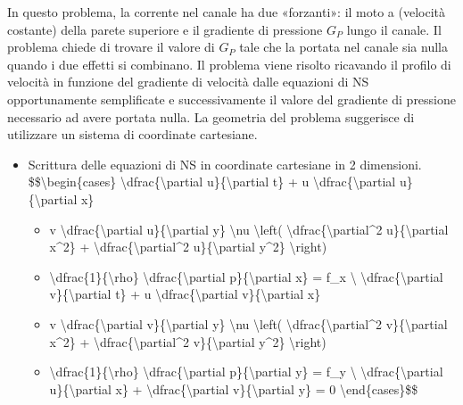 \documentclass[letterpaper,10pt,italian]{jupyterBook}
\begin{document}
\sphinxAtStartPar
In questo problema, la corrente nel canale ha due «forzanti»: il moto
a (velocità costante) della parete superiore e il gradiente di pressione
\(G_P\) lungo il canale. Il problema chiede di trovare il valore di \(G_P\)
tale che la portata nel canale sia nulla quando i due effetti si
combinano. Il problema viene risolto ricavando il profilo di velocità in
funzione del gradiente di velocità dalle equazioni di NS opportunamente
semplificate e successivamente il valore del gradiente di pressione
necessario ad avere portata nulla. La geometria del problema suggerisce
di utilizzare un sistema di coordinate cartesiane.
\begin{itemize}
\item {} 
\sphinxAtStartPar
Scrittura delle equazioni di NS in coordinate cartesiane in 2
dimensioni. \$\$\textbackslash{}begin\{cases\}
\textbackslash{}dfrac\{\textbackslash{}partial u\}\{\textbackslash{}partial t\} + u \textbackslash{}dfrac\{\textbackslash{}partial u\}\{\textbackslash{}partial x\}
\begin{itemize}
\item {} 
\sphinxAtStartPar
v \textbackslash{}dfrac\{\textbackslash{}partial u\}\{\textbackslash{}partial y\} \sphinxhyphen{} \textbackslash{}nu \textbackslash{}left(
\textbackslash{}dfrac\{\textbackslash{}partial\textasciicircum{}2 u\}\{\textbackslash{}partial x\textasciicircum{}2\} +
\textbackslash{}dfrac\{\textbackslash{}partial\textasciicircum{}2 u\}\{\textbackslash{}partial y\textasciicircum{}2\} \textbackslash{}right)

\item {} 
\sphinxAtStartPar
\textbackslash{}dfrac\{1\}\{\textbackslash{}rho\} \textbackslash{}dfrac\{\textbackslash{}partial p\}\{\textbackslash{}partial x\} = f\_x \textbackslash{}
\textbackslash{}dfrac\{\textbackslash{}partial v\}\{\textbackslash{}partial t\} + u \textbackslash{}dfrac\{\textbackslash{}partial v\}\{\textbackslash{}partial x\}

\item {} 
\sphinxAtStartPar
v \textbackslash{}dfrac\{\textbackslash{}partial v\}\{\textbackslash{}partial y\} \sphinxhyphen{} \textbackslash{}nu \textbackslash{}left(
\textbackslash{}dfrac\{\textbackslash{}partial\textasciicircum{}2 v\}\{\textbackslash{}partial x\textasciicircum{}2\} +
\textbackslash{}dfrac\{\textbackslash{}partial\textasciicircum{}2 v\}\{\textbackslash{}partial y\textasciicircum{}2\} \textbackslash{}right)

\item {} 
\sphinxAtStartPar
\textbackslash{}dfrac\{1\}\{\textbackslash{}rho\} \textbackslash{}dfrac\{\textbackslash{}partial p\}\{\textbackslash{}partial y\} = f\_y \textbackslash{}
\textbackslash{}dfrac\{\textbackslash{}partial u\}\{\textbackslash{}partial x\} + \textbackslash{}dfrac\{\textbackslash{}partial v\}\{\textbackslash{}partial y\} = 0
\textbackslash{}end\{cases\}\$\$


\end{itemize}
\end{itemize}
\end{document}
